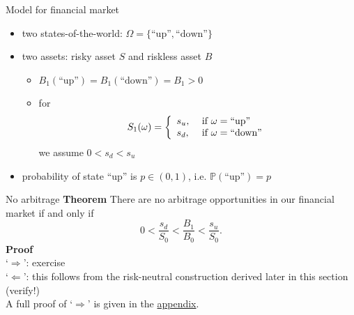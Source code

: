 \documentclass[pdf, handout]{beamer}
\begin{document}
\begin{frame}{Model for financial market}
\begin{itemize}
\item two states-of-the-world: $\Omega=\{ \text{``up''},\text{``down''}\}$
\item two assets: risky asset $S$ and riskless asset $B$
\begin{itemize}
\item $B_1(\text{``up''})=B_1(\text{``down''})=B_1>0$
\item for
\[
S_1(\omega)=\left\{
              \begin{array}{ll}
                s_u, & \hbox{ if } \omega=\text{``up''} \\
                s_d, & \hbox{ if }\omega=\text{``down''}
              \end{array}
            \right.
\]
we assume 
$0<s_d<s_u$
\end{itemize}
\item  probability of state ``up'' is $p\in(0,1)$, i.e. $\mathbb{P}(\text{``up''})=p$
\end{itemize}
\begin{figure}
\centering
{}
\end{figure}
\end{frame}

\begin{frame}{No arbitrage}
\textbf{Theorem} 
There are no arbitrage opportunities in our financial market if and only if 
\[
0<\frac{s_d}{S_0}<\frac{B_1}{B_0}<\frac{s_u}{S_0}.
\]
\textbf{Proof} \\
`$\Rightarrow$':  exercise \\
 `$\Leftarrow$':  this follows from the risk-neutral construction derived later in this section (verify!)
\\ \vspace{.2cm}
A full proof of `$\Rightarrow$' is given in the \hyperlink{app:noarb}{appendix}.
\end{frame}
\end{document}
